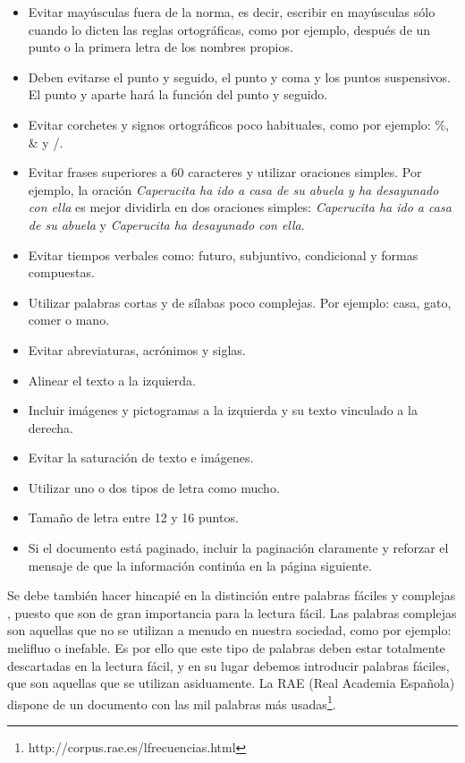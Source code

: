 \begin{itemize}
	\item Evitar mayúsculas fuera de la norma, es decir, escribir en mayúsculas sólo cuando lo dicten las reglas ortográficas, como por ejemplo, después de un punto o la primera letra de los nombres propios.
	\item Deben evitarse el punto y seguido, el punto y coma y los puntos suspensivos. El punto y aparte hará la función del punto y seguido.
	\item Evitar corchetes y signos ortográficos poco habituales, como por ejemplo: \%, \& y /.
	\item Evitar frases superiores a 60 caracteres y utilizar oraciones simples. Por ejemplo, la oración \textit{Caperucita ha ido a casa de su abuela y ha desayunado con ella} es mejor dividirla en dos oraciones simples:\textit{ Caperucita ha ido a casa de su abuela} y  \textit{Caperucita ha desayunado con ella}.
	\item Evitar tiempos verbales como: futuro, subjuntivo, condicional y formas compuestas.
	\item Utilizar palabras cortas y de sílabas poco complejas. 
	Por ejemplo: casa, gato, comer o mano.
	\item Evitar abreviaturas, acrónimos y siglas.
	\item Alinear el texto a la izquierda.
	\item Incluir imágenes y pictogramas a la izquierda y su texto vinculado a la derecha.
	\item Evitar la saturación de texto e imágenes.
	\item Utilizar uno o dos tipos de letra como mucho.
	\item Tamaño de letra entre 12 y 16 puntos.
	\item Si el documento está paginado, incluir la paginación claramente y reforzar el mensaje de que la información continúa en la página siguiente.
\end{itemize}

Se debe también hacer hincapié en la distinción entre palabras fáciles y complejas \citep{GarciaMunoz2012LecturaFacil}, puesto que son de gran importancia para la lectura fácil. 
Las palabras complejas son aquellas que no se utilizan a menudo en nuestra sociedad, como por ejemplo: melifluo o inefable. Es por ello que este tipo de palabras deben estar totalmente descartadas en la lectura fácil, y en su lugar debemos introducir palabras fáciles, que son aquellas que se utilizan asiduamente. La RAE (Real Academia Española) dispone de un documento con las mil palabras más usadas\footnote{http://corpus.rae.es/lfrecuencias.html}.

